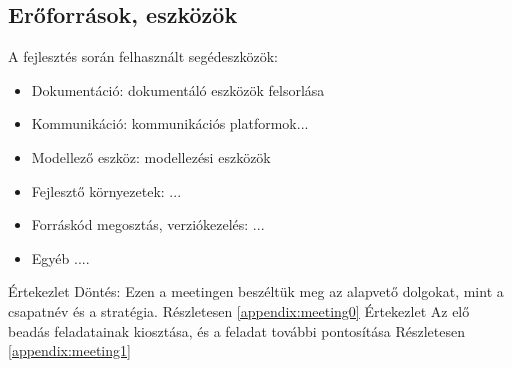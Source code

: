 \documentclass[../../projlab]{subfiles}
\begin{document}
\subsection{Erőforrások, eszközök}
A fejlesztés során felhasznált segédeszközök:
\begin{itemize}
	\item Dokumentáció: dokumentáló eszközök felsorlása
	\item Kommunikáció: kommunikációs platformok...
	\item Modellező eszköz: modellezési eszközök
	\item Fejlesztő környezetek: ...
	\item Forráskód megosztás, verziókezelés: ...
	\item Egyéb ....
\end{itemize}


\clearpage

\begin{naplo}
	{ Értekezlet
		\newline Döntés: Ezen a meetingen beszéltük meg az alapvető dolgokat, mint a csapatnév és a stratégia.
		Részletesen \ref{appendix:meeting0}
	}
	{ Értekezlet
		\newline Az elő beadás feladatainak kiosztása, és a feladat további pontosítása
		Részletesen \ref{appendix:meeting1}
	}
\end{naplo}

\begin{toappendix}


\end{toappendix}
\end{document}
